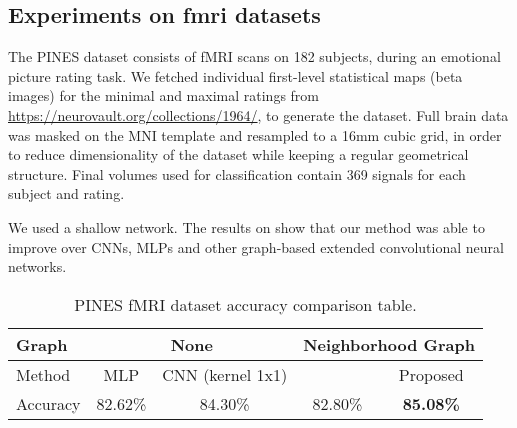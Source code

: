 \subsection{Experiments on fmri datasets}

The PINES dataset consists of fMRI scans on 182 subjects, during an emotional picture rating task\cite{chang2015sensitive}. We fetched individual first-level statistical maps (beta images) for the minimal and maximal ratings from \url{https://neurovault.org/collections/1964/}, to generate the dataset. Full brain data was masked on the MNI template and resampled to a 16mm cubic grid, in order to reduce dimensionality of the dataset while keeping a regular geometrical structure. Final volumes used for classification contain 369 signals for each subject and rating. 

We used a shallow network. The results on  show that our method was able to improve over CNNs, MLPs and other graph-based extended convolutional neural networks.

\begin{table}[h]
\centering
\caption{PINES fMRI dataset accuracy comparison table.}
\label{tab:iaps-table}
\begin{tabular}{|l||c|c||c|c|}
\hline
\multicolumn{1}{|l||}{Graph} & \multicolumn{2}{c||}{None} & \multicolumn{2}{c|}{Neighborhood Graph}     \\ \hline
Method                      & MLP & CNN (kernel 1x1)                                 & \cite{defferrard2016convolutional} & Proposed                   \\ \hline
Accuracy                    & 82.62\% & 84.30\%                            & 82.80\%                            & \textbf{85.08\%} \\ \hline
\end{tabular}
\vspace{-.4cm}
\end{table}


